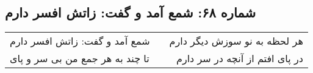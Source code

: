 \begin{center}
\section*{شماره ۶۸: شمع آمد و گفت: زاتش افسر دارم}
\label{sec:068}
\begin{longtable}{l p{0.5cm} r}
شمع آمد و گفت: زاتش افسر دارم
&&
هر لحظه به نو سوزش دیگر دارم
\\
تا چند به هر جمع من بی سر و پای
&&
در پای افتم از آنچه در سر دارم
\\
\end{longtable}
\end{center}
